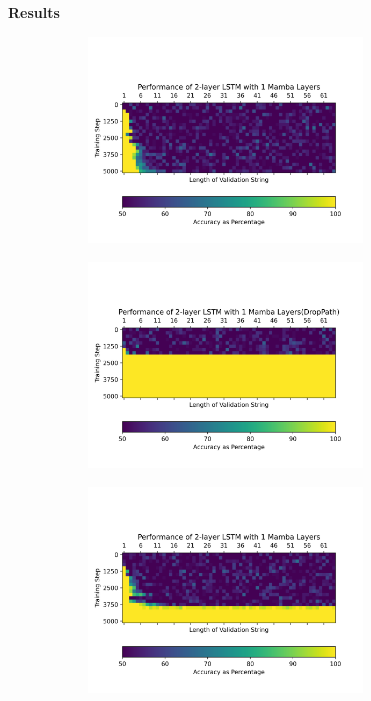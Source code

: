 \textbf{Results}
\begin{figure}
    \begin{subfigure}{0.5\textwidth}
        \begin{center}
        \includegraphics[width=0.8\textwidth]{figures/parity_lstm_False_3_1.png.png}
        \end{center}
    \end{subfigure}\begin{subfigure}{0.5\textwidth}
        \begin{center}
        \includegraphics[width=0.8\textwidth]{figures/parity_lstm_True_3_1.png.png}
        \end{center}
    \end{subfigure}
    \begin{subfigure}{0.5\textwidth}
        \begin{center}
        \includegraphics[width=0.8\textwidth]{figures/parity_lstm_False_3_2.png.png}

\end{center}
\end{subfigure}
\end{figure}
